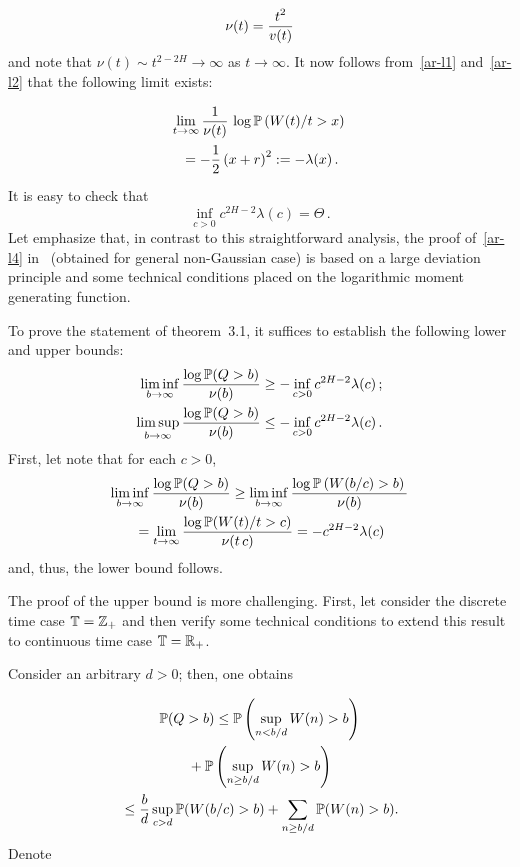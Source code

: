 \begin{multicols}{2}
\noindent
$$
\nu(t)=\displaystyle\frac{\displaystyle t^2\mathstrut}{\displaystyle v(t)\mathstrut}
$$
and note that $\nu(t) \sim t^{2-2H} \to \infty$ as $t \to \infty$.
It now follows from~\eqref{ar-l1} and~\eqref{ar-l2} that the
following limit exists:

\vspace*{-6pt}

\noindent
\begin{multline}
\lim\limits_{t \to \infty} \displaystyle\frac{\displaystyle 1\mathstrut}{\displaystyle \nu(t)\mathstrut}\,\log \mathbb{P}\left( W(t)/t >x
\right){}\\
{}=-\displaystyle\frac{\displaystyle 1\mathstrut}{\displaystyle 2\mathstrut}\left(x+r\right)^2:=-\lambda(x)\,.
\label{ar-l4}
\end{multline}
It is easy to check that
$$
\inf\limits_{c>0}c^{2H-2}\lambda(c)=\Theta\,.
$$
Let emphasize  that, in contrast to this  straightforward
analysis, the proof of~\eqref{ar-l4} in~\cite{Duffield, Duffy}
(obtained for general non-Gaussian case)  is  based on a large
deviation principle and  some  technical conditions placed on the
logarithmic moment generating function.

To prove the statement of theorem~3.1, it suffices to establish the
following lower and upper bounds:
\begin{align}
\liminf_{b \to \infty}\displaystyle\frac{\displaystyle \log \mathbb{P} (Q>b)\mathstrut}{\displaystyle \nu(b)\mathstrut}&\geq
-\inf\limits_{c>0}c^{2H-2}\lambda(c)\,;\label{asymp-l2}\\
\limsup\limits_{b \to \infty}\displaystyle\frac{\displaystyle \log \mathbb{P} (Q>b)\mathstrut}{\displaystyle \nu(b)\mathstrut}&\leq -\inf_{c>0}
c^{2H-2}\lambda(c) \label{asymp-l3}\,.
\end{align}
First, let note that for each $c>0$,
\begin{multline*}
\liminf\limits_{b \to \infty}\displaystyle\frac{\displaystyle \log \mathbb{P} (Q>b)\mathstrut}{\displaystyle \nu(b)\mathstrut} \geq
\liminf\limits_{b \to \infty} \displaystyle\frac{\displaystyle \log \mathbb{P} \left( W(b/c)>b \right)\mathstrut}{\displaystyle \nu(b)\mathstrut}\\
{}=\lim_{t \to \infty}\displaystyle\frac{\displaystyle  \log \mathbb{P} (W(t)/t >c)\mathstrut}{\displaystyle \nu(t\,c)\mathstrut}
= -c^{2H-2}\lambda(c)
\end{multline*}
and, thus,  the lower bound follows.

The proof of the upper bound is  more challenging. First, let consider the
 discrete time case $\mathbb{T}=\mathbb{Z}_+$ and then  verify some technical conditions
to extend this  result to continuous time case $\mathbb{T}=\mathbb R_+$.

Consider an arbitrary $d>0$; then, one obtains

\noindent
\begin{multline}
\mathbb{P} (Q>b) \leq \mathbb{P} \left( \sup_{n<b/d}W(n)>b \right)\\
{}+\mathbb{P} \left(
\sup\limits_{n \geq b/d}W(n)>b \right)\\
{}\leq \displaystyle\frac{\displaystyle b\mathstrut}{\displaystyle d\mathstrut}\sup_{c>d}\mathbb{P} (W(b/c)>b) +\sum\limits_{n \geq b/d}\mathbb{P}
(W(n)>b).
\label{asymp-l7}
\end{multline}
Denote


\end{multicols}
